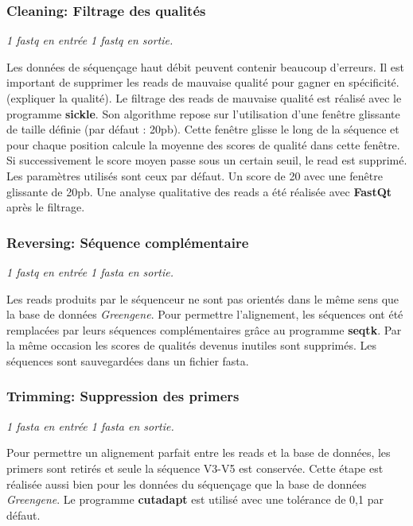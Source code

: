 \documentclass[12pt,a4paper]{article}
\begin{document}
\subsubsection{Cleaning: Filtrage des qualités}
\noindent\emph{1 fastq en entrée 1 fastq en sortie. }

Les données de séquençage haut débit peuvent contenir beaucoup d'erreurs. Il est important de supprimer les reads de mauvaise qualité pour gagner en spécificité. (expliquer la qualité).
Le filtrage des reads de mauvaise qualité est réalisé avec le programme \textbf{sickle}\cite{JoshiNA2011}. Son algorithme repose sur l'utilisation d'une fenêtre glissante de taille définie (par défaut : 20pb). Cette fenêtre glisse le long de la séquence et pour chaque position calcule la moyenne des scores de qualité dans cette fenêtre. Si successivement le score moyen passe sous un certain seuil, le read est supprimé. Les paramètres utilisés sont ceux par défaut. Un score de 20 avec une fenêtre glissante de 20pb.
Une analyse qualitative des reads a été réalisée avec \textbf{FastQt}\cite{Labsquareteam2017} après le filtrage.


\subsubsection{Reversing: Séquence complémentaire}
\noindent\emph{1 fastq en entrée 1 fasta en sortie. }

Les reads produits par le séquenceur ne sont pas orientés dans le même sens que la base de données \textit{Greengene}\cite{DeSantis2006}. Pour permettre l'alignement, les séquences ont été remplacées par leurs séquences complémentaires grâce au programme \textbf{seqtk}\cite{H.Li}.
Par la même occasion les scores de qualités devenus inutiles sont supprimés. Les séquences sont sauvegardées dans un fichier fasta.

\subsubsection{Trimming: Suppression des primers}
\noindent\emph{1 fasta en entrée 1 fasta en sortie.}

Pour permettre un alignement parfait entre les reads et la base de données, les primers sont retirés et seule la séquence V3-V5 est conservée. Cette étape est réalisée aussi bien pour les données du séquençage que  la base de données \textit{Greengene}.
Le programme \textbf{cutadapt}\cite{Martin2011} est utilisé avec une tolérance de 0,1 par défaut.
\end{document}
